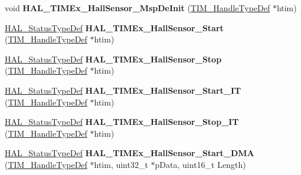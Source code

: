 \begin{DoxyCompactItemize}
void {\bfseries H\+A\+L\+\_\+\+T\+I\+M\+Ex\+\_\+\+Hall\+Sensor\+\_\+\+Msp\+De\+Init} (\mbox{\hyperlink{struct_t_i_m___handle_type_def}{T\+I\+M\+\_\+\+Handle\+Type\+Def}} $\ast$htim)
\item 
\mbox{\label{group___t_i_m_ex___exported___functions___group1_ga9f4bfa2a4b890a2219ca927bbbb455fc}} 
\mbox{\hyperlink{stm32f7xx__hal__def_8h_a63c0679d1cb8b8c684fbb0632743478f}{H\+A\+L\+\_\+\+Status\+Type\+Def}} {\bfseries H\+A\+L\+\_\+\+T\+I\+M\+Ex\+\_\+\+Hall\+Sensor\+\_\+\+Start} (\mbox{\hyperlink{struct_t_i_m___handle_type_def}{T\+I\+M\+\_\+\+Handle\+Type\+Def}} $\ast$htim)
\item 
\mbox{\label{group___t_i_m_ex___exported___functions___group1_ga714c2a7a51f4ab61b04df84ab182eb86}} 
\mbox{\hyperlink{stm32f7xx__hal__def_8h_a63c0679d1cb8b8c684fbb0632743478f}{H\+A\+L\+\_\+\+Status\+Type\+Def}} {\bfseries H\+A\+L\+\_\+\+T\+I\+M\+Ex\+\_\+\+Hall\+Sensor\+\_\+\+Stop} (\mbox{\hyperlink{struct_t_i_m___handle_type_def}{T\+I\+M\+\_\+\+Handle\+Type\+Def}} $\ast$htim)
\item 
\mbox{\label{group___t_i_m_ex___exported___functions___group1_gaf3e7068c5bc6fc74e016cc8e990cbb02}} 
\mbox{\hyperlink{stm32f7xx__hal__def_8h_a63c0679d1cb8b8c684fbb0632743478f}{H\+A\+L\+\_\+\+Status\+Type\+Def}} {\bfseries H\+A\+L\+\_\+\+T\+I\+M\+Ex\+\_\+\+Hall\+Sensor\+\_\+\+Start\+\_\+\+IT} (\mbox{\hyperlink{struct_t_i_m___handle_type_def}{T\+I\+M\+\_\+\+Handle\+Type\+Def}} $\ast$htim)
\item 
\mbox{\label{group___t_i_m_ex___exported___functions___group1_gac6ab7ab0cada425a8d4deb637bd2ad71}} 
\mbox{\hyperlink{stm32f7xx__hal__def_8h_a63c0679d1cb8b8c684fbb0632743478f}{H\+A\+L\+\_\+\+Status\+Type\+Def}} {\bfseries H\+A\+L\+\_\+\+T\+I\+M\+Ex\+\_\+\+Hall\+Sensor\+\_\+\+Stop\+\_\+\+IT} (\mbox{\hyperlink{struct_t_i_m___handle_type_def}{T\+I\+M\+\_\+\+Handle\+Type\+Def}} $\ast$htim)
\item 
\mbox{\label{group___t_i_m_ex___exported___functions___group1_ga3d0d063498f6888d61411d56380f5211}} 
\mbox{\hyperlink{stm32f7xx__hal__def_8h_a63c0679d1cb8b8c684fbb0632743478f}{H\+A\+L\+\_\+\+Status\+Type\+Def}} {\bfseries H\+A\+L\+\_\+\+T\+I\+M\+Ex\+\_\+\+Hall\+Sensor\+\_\+\+Start\+\_\+\+D\+MA} (\mbox{\hyperlink{struct_t_i_m___handle_type_def}{T\+I\+M\+\_\+\+Handle\+Type\+Def}} $\ast$htim, uint32\+\_\+t $\ast$p\+Data, uint16\+\_\+t Length)

\end{DoxyCompactItemize}
